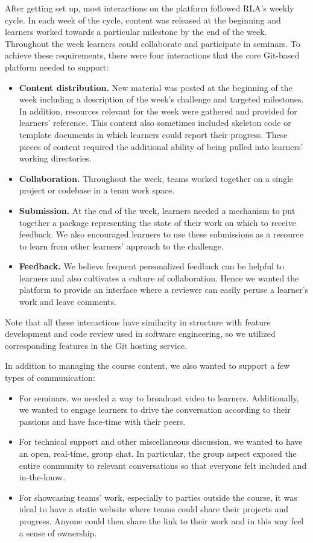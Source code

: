\documentclass[12pt,twoside]{mitthesis}
\begin{document}
After getting set up, most interactions on the platform followed RLA's weekly cycle. In each week of the cycle, content was released at the beginning and learners worked towards a particular milestone by the end of the week. Throughout the week learners could collaborate and participate in seminars. To achieve these requirements, there were four interactions that the core Git-based platform needed to support:
\begin{itemize}
\item \textbf{Content distribution.} New material was posted at the beginning of the week including a description of the week's challenge and targeted milestones. In addition, resources relevant for the week were gathered and provided for learners' reference. This content also sometimes included skeleton code or template documents in which learners could report their progress. These pieces of content required the additional ability of being pulled into learners' working directories.
\item \textbf{Collaboration.} Throughout the week, teams worked together on a single project or codebase in a team work space. 
\item \textbf{Submission.} At the end of the week, learners needed a mechanism to put together a package representing the state of their work on which to receive feedback. We also encouraged learners to use these submissions as a resource to learn from other learners' approach to the challenge.
\item \textbf{Feedback.} We believe frequent personalized feedback can be helpful to learners and also cultivates a culture of collaboration. Hence we wanted the platform to provide an interface where a reviewer can easily peruse a learner's work and leave comments. 
\end{itemize}
Note that all these interactions have similarity in structure with feature development and code review used in software engineering, so we utilized corresponding features in the Git hosting service.

In addition to managing the course content, we also wanted to support a few types of communication:
\begin{itemize}
\item For seminars, we needed a way to broadcast video to learners. Additionally, we wanted to engage learners to drive the conversation according to their passions and have face-time with their peers.
\item For technical support and other miscellaneous discussion, we wanted to have an open, real-time, group chat. In particular, the group aspect exposed the entire community to relevant conversations so that everyone felt included and in-the-know.
\item For showcasing teams' work, especially to parties outside the course, it was ideal to have a static website where teams could share their projects and progress. Anyone could then share the link to their work and in this way feel a sense of ownership.
\end{itemize}
\end{document}
